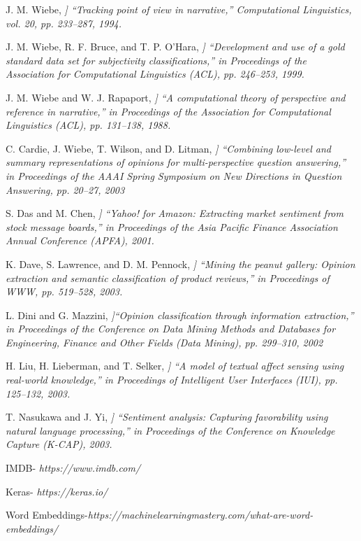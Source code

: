 \documentclass[conference]{IEEEtran}
\begin{document}
\begin{thebibliography}{00}
 J. M. Wiebe,
{\em ]  “Tracking point of view in narrative,” Computational Linguistics,
vol. 20, pp. 233–287, 1994.}

J. M. Wiebe, R. F. Bruce, and T. P. O’Hara,
{\em ]   “Development and use of a
gold standard data set for subjectivity classifications,” in Proceedings of the
Association for Computational Linguistics (ACL), pp. 246–253, 1999.}

J. M. Wiebe and W. J. Rapaport,
{\em ]   “A computational theory of perspective and
reference in narrative,” in Proceedings of the Association for Computational
Linguistics (ACL), pp. 131–138, 1988.}

 C. Cardie, J. Wiebe, T. Wilson, and D. Litman,
{\em ]  “Combining low-level and
summary representations of opinions for multi-perspective question answering,” in Proceedings of the AAAI Spring Symposium on New Directions in
Question Answering, pp. 20–27, 2003}

  S. Das and M. Chen,
{\em ] “Yahoo! for Amazon: Extracting market sentiment from
stock message boards,” in Proceedings of the Asia Pacific Finance Association
Annual Conference (APFA), 2001.}

   K. Dave, S. Lawrence, and D. M. Pennock,
{\em ]  “Mining the peanut gallery: Opinion extraction and semantic classification of product reviews,” in Proceedings
of WWW, pp. 519–528, 2003.}

   L. Dini and G. Mazzini, 
{\em ]“Opinion classification through information extraction,” in Proceedings of the Conference on Data Mining Methods and
Databases for Engineering, Finance and Other Fields (Data Mining),
pp. 299–310, 2002}

    H. Liu, H. Lieberman, and T. Selker,
{\em ]  “A model of textual affect sensing using
real-world knowledge,” in Proceedings of Intelligent User Interfaces (IUI),
pp. 125–132, 2003.}

     T. Nasukawa and J. Yi, 
{\em ] “Sentiment analysis: Capturing favorability using
natural language processing,” in Proceedings of the Conference on Knowledge
Capture (K-CAP), 2003.}

IMDB-
{\em https://www.imdb.com/}


Keras-
{\em https://keras.io/}


Word Embeddings-{\em https://machinelearningmastery.com/what-are-word-embeddings/}


\end{thebibliography}
\end{document}
